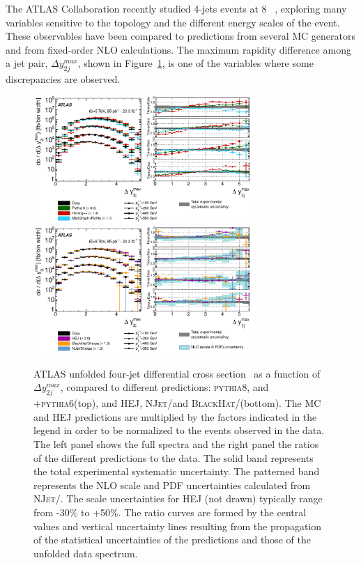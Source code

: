 \documentclass{PoS}
\providecommand{\NJET} {{\textsc{NJet}}\xspace}
\providecommand{\BLACKHAT} {{\textsc{BlackHat}}\xspace}
\providecommand{\HEJ} {{\textsc{HEJ}}\xspace}
\providecommand{\PYTHIAS} {{\textsc{pythia6}}\xspace}
\providecommand{\PYTHIAE} {{\textsc{pythia8}}\xspace}
\begin{document}
The ATLAS Collaboration recently studied 4-jets events at 8 \TeV~\cite{Aad:2015nda}, exploring many variables sensitive to the topology and the
different energy scales of the event. These observables have been compared to predictions from several MC
generators and from fixed-order NLO calculations. The maximum rapidity difference among a jet pair, $\Delta
y_{2j}^{max}$, shown in Figure~\ref{fig:4jet}, is one of the variables where some discrepancies are observed.
\begin{figure}[htbp]
  \centering
  \includegraphics[width=0.75\textwidth]{Figure6a.pdf}\\
  \includegraphics[width=0.75\textwidth]{Figure6b.pdf}
  \caption{ATLAS unfolded four-jet differential cross section~\cite{Aad:2015nda} as a function of $\Delta y_{2j}^{max}$, compared to different
    predictions: \PYTHIAE, \HERWIGpp and \MADGRAPH+\PYTHIAS (top), and HEJ, \NJET/\SHERPA and \BLACKHAT/\SHERPA (bottom). The MC
    and \HEJ predictions are multiplied by the factors indicated in the legend in order to be normalized to the events observed in the data. The left 
    panel shows the full spectra and the right panel the ratios of the different predictions to the data. The solid band represents the total experimental systematic
    uncertainty. The patterned band represents the NLO scale and PDF uncertainties calculated from
     \NJET/\SHERPA. The scale uncertainties for HEJ (not drawn) typically range from -30\% to +50\%. The ratio curves
     are formed by the central values and vertical uncertainty lines resulting from the 
    propagation of the statistical uncertainties of the predictions and those of the unfolded data spectrum.} 
  \label{fig:4jet}
\end{figure} 
\end{document}
